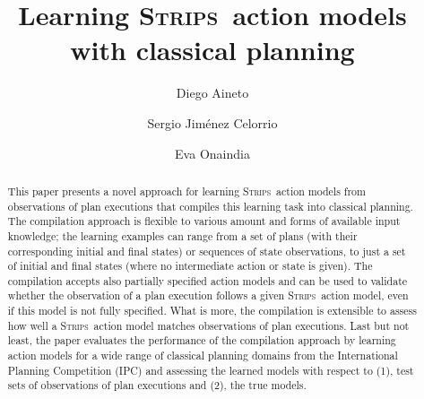 \documentclass[3p,times]{elsarticle}
\newcommand{\strips}{\textsc{Strips}}     %
\begin{document}
\begin{frontmatter}



\dochead{}

\title{Learning \strips\ action models with classical planning}
\author[label1]{Diego Aineto}
\author[label1]{Sergio Jim\'{e}nez Celorrio}
\author[label1]{Eva Onaindia}
\address[label1]{Department of Computer Systems and Computation, Universitat Politécnica de València. Spain}




\begin{abstract}
  This paper presents a novel approach for learning \strips\ action models from observations of plan executions that compiles this learning task into classical planning. The compilation approach is flexible to various amount and forms of available input knowledge; the learning examples can range from a set of plans (with their corresponding initial and final states) or sequences of state observations, to just a set of initial and final states (where no intermediate action or state is given). The compilation accepts also partially specified action models and can be used to validate whether the observation of a plan execution follows a given \strips\ action model, even if this model is not fully specified. What is more, the compilation is extensible to assess how well a \strips\ action model matches observations of plan executions. Last but not least, the paper evaluates the performance of the compilation approach by learning action models for a wide range of classical planning domains from the International Planning Competition (IPC) and assessing the learned models with respect to (1), test sets of observations of plan executions and (2), the true models.
\end{abstract}


\end{frontmatter}
\end{document}
